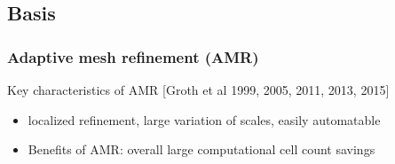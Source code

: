 \documentclass{beamer}
\begin{document}
\subsection{Basis}
\begin{frame}%
\frametitle{Adaptive mesh refinement (AMR)}
\tiny
\begin{minipage}[t][1\textheight]{1\textwidth}
\vspace{-15pt}
\begin{exampleblock}{Key characteristics of AMR}
[Groth et al 1999, 2005, 2011, 2013, 2015]\newline [Berger et al 1984, 1986, 1989] \newline [Aftosmis et al 1998, 2000, 2004]
\begin{itemize}
\tiny
\item localized refinement, large variation of scales, easily automatable
\item Benefits of AMR: overall large computational cell count savings
\end{itemize}
\vspace{-20pt}
\begin{figure}
\label{fig:cubeAMRbased}
\centering
{}
\end{figure}
\end{exampleblock}
\end{minipage}

\end{frame}
\end{document}
